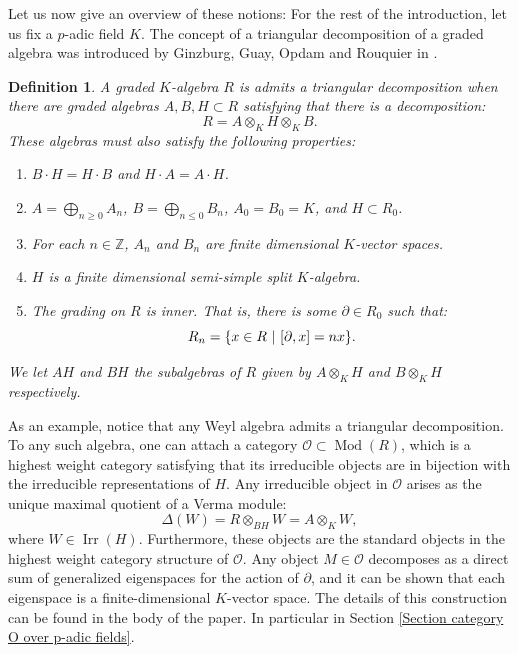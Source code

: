 \documentclass{amsart}
\newtheorem*{defi*}{ Definition}
\newcommand{\Mod}{\operatorname{Mod}}
\newcommand{\OX}{\mathcal{O}}
\begin{document}
Let us now give an overview of these notions: For the rest of the introduction, let us fix a $p$-adic field $K$. The concept of a triangular decomposition of a graded algebra was introduced by Ginzburg, Guay, Opdam and Rouquier in \cite{ginzburg2003category}.
\begin{defi*}
A graded $K$-algebra $R$ is admits a triangular decomposition when there are graded algebras $A,B,H\subset R$ satisfying that there is a decomposition:
\begin{equation*}
    R=A\otimes_KH\otimes_KB.
\end{equation*}
These algebras must also satisfy the following properties:
\begin{enumerate}[label=(\roman*)]
   \item $B\cdot  H=H\cdot B$ and $H\cdot A=A\cdot H$.
    \item $A=\bigoplus_{n\geq 0}A_n$, $B=\bigoplus_{n\leq 0}B_n$, $A_0=B_0=K$, and $H\subset R_0$. 
    \item For each $n\in\mathbb{Z}$, $A_n$ and $B_n$ are finite dimensional $K$-vector spaces.
    \item $H$ is a finite dimensional semi-simple split $K$-algebra.
    \item The grading on $R$ is inner. That is, there is some $\partial\in R_0$ such that:
    \begin{equation*}
        R_n=\{ x\in R \textnormal{ }\vert \textnormal{ } [\partial,x]=nx   \}.
    \end{equation*}
\end{enumerate}
We let $AH$ and $BH$ the subalgebras of $R$ given by  $A\otimes_KH$ and $B\otimes_KH$ respectively.    
\end{defi*}
As an example, notice that any Weyl algebra admits a triangular decomposition. To any such algebra, one can attach a category $\OX\subset \Mod(R)$, which is a highest weight category satisfying that its irreducible objects are in bijection with the irreducible representations of $H$. Any irreducible object in $\OX$ arises as the unique maximal quotient of a Verma module:
\begin{equation*}
    \Delta(W)=R\otimes_{BH}W =A\otimes_KW,
\end{equation*}
where $W\in\operatorname{Irr}(H)$. Furthermore, these objects are the standard objects in the highest weight category structure of $\OX$. Any object $M\in \OX$ decomposes as a direct sum of generalized eigenspaces for the action of $\partial$, and it can be shown that each eigenspace is a finite-dimensional $K$-vector space. The details of this construction can be found in the body of the paper. In particular in Section \ref{Section category O over p-adic fields}.\bigskip
\end{document}
